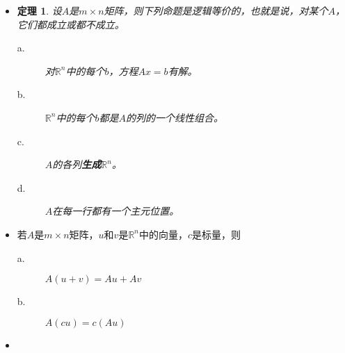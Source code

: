 \documentclass[UTF8]{report}
\newtheorem{theorem}{定理}
\begin{document}
\begin{itemize}
		\item \begin{theorem}
		设$ A $是$ m \times n $矩阵，则下列命题是逻辑等价的，也就是说，对某个$ A $，它们都成立或都不成立。
			\begin{description}
			\item[a.] 对$\mathbb{R}^n$中的每个$ b $，方程$ Ax=b $有解。
			\item[b.] $\mathbb{R}^n$中的每个$ b $都是$ A $的列的一个线性组合。
			\item[c.] $ A $的各列\textbf{生成}$\mathbb{R}^n$。
			\item[d.] $ A $在每一行都有一个主元位置。
			\end{description}
		\end{theorem}
	
		\item 若$ A $是$ m \times n $矩阵，$ u\textrm{和}v\textrm{是}\mathbb{R}^n $中的向量，$ c $是标量，则
			\begin{description}
				\item[a.] $ A(u+v)=Au+Av $
				\item[b.] $ A(cu)=c(Au) $
			\end{description}
		
		\item 
	\end{itemize}
\end{document}

